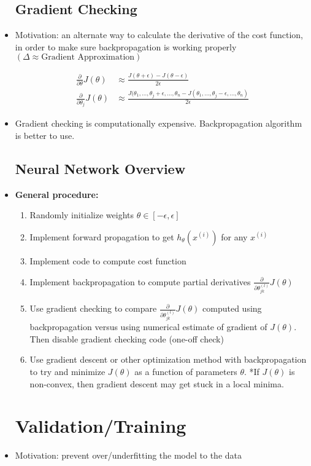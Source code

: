 \documentclass[titlepage]{article}
\begin{document}
\begin{itemize}
\subsection{Gradient Checking}
\item Motivation: an alternate way to calculate the derivative of the cost function, in order to make sure backpropagation is working properly $(\Delta \approx \text{Gradient Approximation})$

\begin{align*}
\frac{\partial}{\partial\theta} J(\theta) &\approx \frac{J(\theta + \epsilon) - J(\theta -\epsilon)}{2\epsilon}\\
\frac{\partial}{\partial\theta_j} J(\theta) &\approx \frac{J(\theta_1,...,\theta_j + \epsilon,...,\theta_n - 
	J(\theta_1,...,\theta_j - \epsilon,...,\theta_n)}{2\epsilon}
\end{align*}

\item Gradient checking is computationally expensive. Backpropagation algorithm is better to use.


\subsection{Neural Network Overview}
\item \textbf{General procedure:}
\begin{enumerate}
\item Randomly initialize weights $\theta \in [-\epsilon, \epsilon]$
\item Implement forward propagation to get $h_\theta(x^{(i)})$ for any $x^{(i)}$
\item Implement code to compute cost function
\item Implement backpropagation to compute partial derivatives $\frac{\partial}{\partial\theta_{jk}^{(l)}} J(\theta)$
\item Use gradient checking to compare $\frac{\partial}{\partial\theta_{jk}^{(l)}} J(\theta)$ computed using backpropagation versus using numerical estimate of gradient of $J(\theta)$. Then disable gradient checking code (one-off check)
\item Use gradient descent or other optimization method with backpropagation to try and minimize $J(\theta)$ as a function of parameters $\theta$. *If $J(\theta)$ is non-convex, then gradient descent may get stuck in a local minima.
\end{enumerate}

\section{Validation/Training}
\item Motivation: prevent over/underfitting the model to the data


\end{itemize}
\end{document}
